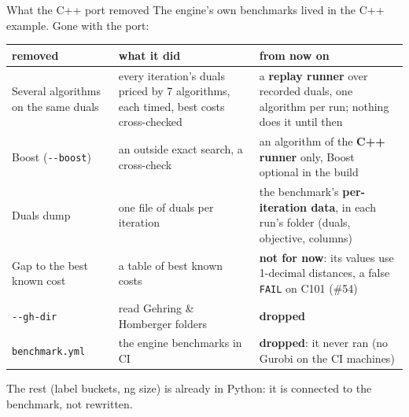 \documentclass[aspectratio=169]{beamer}
\begin{document}
\begin{frame}{What the C++ port removed}
  \small The engine's own benchmarks lived in the C++ example. Gone with the port:

  \vspace{0.4em}
  \footnotesize
  \begin{tabular}{@{}>{\raggedright\arraybackslash}p{}
                    >{\raggedright\arraybackslash}p{}
                    >{\raggedright\arraybackslash}p{}@{}}
    \toprule
    removed & what it did & from now on \\
    \midrule
    Several algorithms on the same duals & every iteration's duals priced by 7 algorithms, each timed, best costs
      cross-checked & a \textbf{replay runner} over recorded duals, one algorithm per run; nothing does it until
      then \\
    Boost (\texttt{-{}-boost}) & an outside exact search, a cross-check & an algorithm of the \textbf{C++ runner} only,
      Boost optional in the build \\
    Duals dump & one file of duals per iteration & the benchmark's \textbf{per-iteration data}, in each run's folder
      (duals, objective, columns) \\
    Gap to the best known cost & a table of best known costs & \textbf{not for now}: its values use 1-decimal
      distances, a false \texttt{FAIL} on C101 (\#54) \\
    \texttt{-{}-gh-dir} & read Gehring \& Homberger folders & \textbf{dropped} \\
    \texttt{benchmark.yml} & the engine benchmarks in CI & \textbf{dropped}: it never ran (no Gurobi on the CI
      machines) \\
    \bottomrule
  \end{tabular}

  \vspace{0.5em}
  \small The rest (label buckets, ng size) is already in Python: it is connected to the benchmark, not rewritten.
\end{frame}
\end{document}
